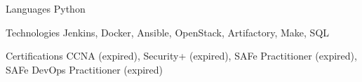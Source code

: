
\begin{cvskills}
  \cvskill
    {Languages} %
    {
        Python
    } %

  \cvskill
    {Technologies} %
    {
        Jenkins,
        Docker,
        Ansible,
        OpenStack,
        Artifactory,
        Make,
        SQL
    } %

  \cvskill
    {Certifications}
    {
        CCNA (expired),
        Security+ (expired),
        SAFe Practitioner (expired),
        SAFe DevOps Practitioner (expired)
    }

\end{cvskills}
